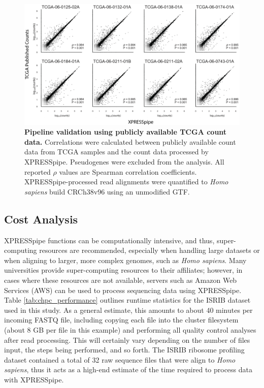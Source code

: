 \documentclass[10pt, oneside]{article}
\begin{document}
\begin{multicols}{2}
\begin{figure}
\centering
  \includegraphics[width=180mm]{figures/xpresspipe_figure4.png}
  \caption{\textbf{Pipeline validation using publicly available TCGA count data.} Correlations were calculated between publicly available count data from TCGA samples and the count data processed by XPRESSpipe. Pseudogenes were excluded from the analysis. All reported $\rho$ values are Spearman correlation coefficients. XPRESSpipe-processed read alignments were quantified to \textit{Homo sapiens} build CRCh38v96 using an unmodified GTF.}
  \label{fig:figure4}
\end{figure}


\subsection*{Cost Analysis}
XPRESSpipe functions can be computationally intensive, and thus, super-computing resources are recommended, especially when handling large datasets or when aligning to larger, more complex genomes, such as \textit{Homo sapiens}. Many universities provide super-computing resources to their affiliates; however, in cases where these resources are not available, servers such as Amazon Web Services (AWS) \cite{aws} can be used to process sequencing data using XPRESSpipe. Table \ref{tab:chpc_performance} outlines runtime statistics for the ISRIB dataset used in this study. As a general estimate, this amounts to about 40 minutes per incoming FASTQ file, including copying each file into the cluster filesystem (about 8 GB per file in this example) and performing all quality control analyses after read processing. This will certainly vary depending on the number of files input, the steps being performed, and so forth. The ISRIB ribosome profiling dataset contained a total of 32 raw sequence files that were align to \textit{Homo sapiens}, thus it acts as a high-end estimate of the time required to process data with XPRESSpipe. \par


\end{multicols}
\end{document}

